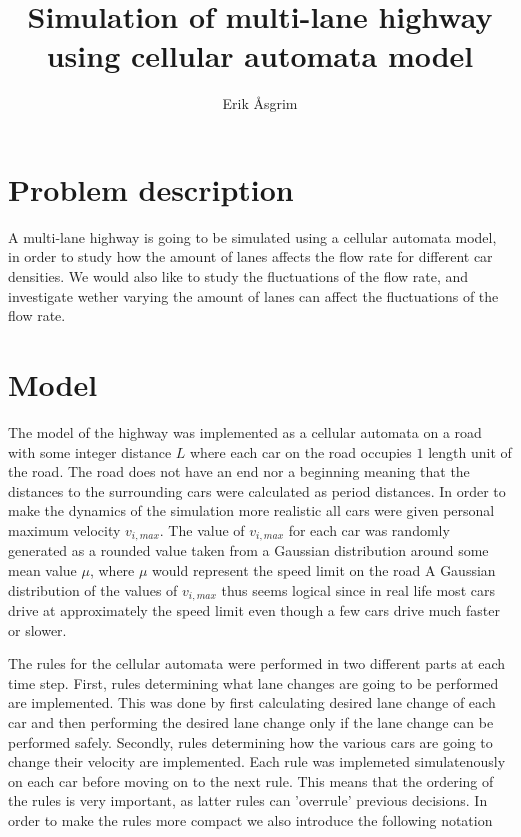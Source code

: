 \documentclass[a4paper,12pt]{article}
\title{Simulation of multi-lane highway using cellular automata model}
\author{Erik Åsgrim}
\begin{document}
\maketitle

\section*{Problem description}
A multi-lane highway is going to be simulated using a cellular automata model, in order to study how the amount of lanes affects the flow rate for different car densities. We would also
like to study the fluctuations of the flow rate, and investigate wether varying the amount of lanes can affect the fluctuations of the flow rate.
\section*{Model}
The model of the highway was implemented as a cellular automata on a road with some integer distance $L$ where each car on the road occupies $1$ length unit of the road. 
The road does not have an end nor a beginning meaning that the distances to the surrounding cars were calculated as period distances.
In order to make the dynamics of the simulation more realistic all cars were given personal maximum velocity $v_{i,max}$. The value of $v_{i, max}$ for each car was randomly generated 
as a rounded value taken from a Gaussian distribution around some mean value $\mu$, where $\mu$ would represent the speed limit on the road A Gaussian distribution of the values of $v_{i, max}$ thus
seems logical since in real life most cars drive at approximately the speed limit even though a few cars drive much faster or slower.

The rules for the cellular automata were performed in two different parts at each time step.
First, rules determining what lane changes are going to be performed are implemented. This was done by first calculating desired lane change of each car and then
performing the desired lane change only if the lane change can be performed safely.
Secondly, rules determining how the various cars are going to change their velocity are implemented.
Each rule was implemeted simulatenously on each car before moving on to the next rule. This means that the ordering of the rules is very important, as latter rules can 'overrule' previous decisions.
In order to make the rules more compact we also introduce the following notation
\end{document}
